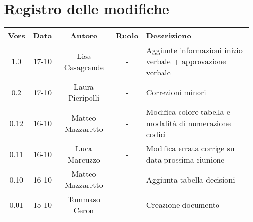 \section{Registro delle modifiche}

\begin{table}[htbp]
	\begin{tabular}{|c|c|c|c|p{}|}
		\hline
		\rowcolor[gray]{0.9}
		Vers & Data & Autore & Ruolo & Descrizione \\
		\hline
		1.0 & 17-10 & Lisa Casagrande & - & Aggiunte informazioni inizio verbale + approvazione verbale\\
		\hline
		0.2 & 17-10 & Laura Pieripolli & - & Correzioni minori \\ 
		\hline
		0.12 & 16-10 & Matteo Mazzaretto & - & Modifica colore tabella e modalità di numerazione codici\\
		\hline
		0.11 & 16-10 & Luca Marcuzzo & - & Modifica errata corrige su data prossima riunione \\
		\hline
		0.10 & 16-10 & Matteo Mazzaretto & - & Aggiunta tabella decisioni \\
		\hline
		0.01 & 15-10 & Tommaso Ceron & - & Creazione documento \\
		\hline
	\end{tabular}
\end{table}